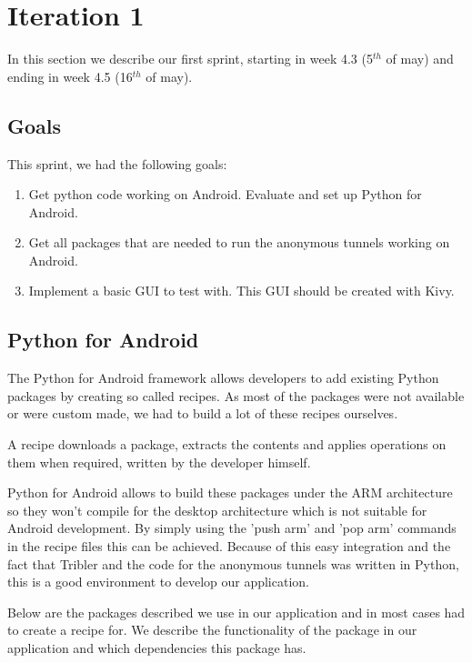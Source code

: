 \section{Iteration 1}
\label{iteration1}
	In this section we describe our first sprint, starting in week 4.3 (5$^{th}$ of may) and ending in week 4.5 (16$^{th}$ of may).

	\subsection{Goals}
		This sprint, we had the following goals:
	
		\begin{enumerate}
			\item Get python code working on Android. Evaluate and set up Python for Android.
			\item Get all packages that are needed to run the anonymous tunnels working on Android.
			\item Implement a basic GUI to test with. This GUI should be created with Kivy.
		\end{enumerate}
	
	\subsection{Python for Android}
		The Python for Android framework allows developers to add existing Python packages by creating so called recipes. As most of the packages were not available or were custom made, we had to build a lot of these recipes ourselves.
	
		A recipe downloads a package, extracts the contents and applies operations on them when required, written by the developer himself.
	
		Python for Android allows to build these packages under the ARM architecture so they won't compile for the desktop architecture which is not suitable for Android development. By simply using the 'push arm' and 'pop arm' commands in the recipe files this can be achieved. Because of this easy integration and the fact that Tribler and the code for the anonymous tunnels was written in Python, this is a good environment to develop our application.
	
		Below are the packages described we use in our application and in most cases had to create a recipe for. We describe the functionality of the package in our application and which dependencies this package has.
	
